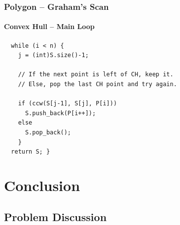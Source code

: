 \documentclass{beamer}
\begin{document}
\begin{frame}[fragile]
  \frametitle{Polygon -- Graham's Scan}
  \framesubtitle{Convex Hull -- Main Loop}

  {\small
    \begin{exampleblock}{}
\begin{verbatim}  
  while (i < n) {   
    j = (int)S.size()-1;
 
    // If the next point is left of CH, keep it.
    // Else, pop the last CH point and try again.

    if (ccw(S[j-1], S[j], P[i])) 
      S.push_back(P[i++]); 
    else 
      S.pop_back(); 
    }
  return S; }
\end{verbatim}
\end{exampleblock}}
\end{frame}


\section{Conclusion}

\subsection{Problem Discussion}

\end{document}
